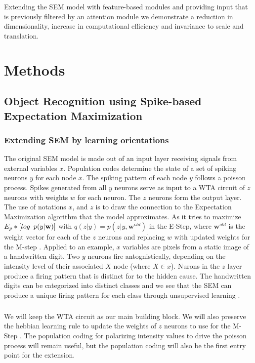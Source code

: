 \documentclass{report}
\begin{document}
Extending the SEM model with feature-based modules and providing input that is previously filtered by an attention module we demonstrate a reduction in dimensionality, increase in computational efficiency and invariance to scale and translation.

\chapter{Methods}
\section{Object Recognition using Spike-based Expectation Maximization}

\subsection{Extending SEM by learning orientations}

The original SEM model is made out of an input layer receiving signals from external variables $x$. Population codes determine the state of a set of spiking neurons $y$ for each node $x$. The spiking pattern of each node $y$ follows a poisson process. Spikes generated from all $y$ neurons serve as input to a WTA circuit of $z$ neurons with weights \textbf{$w$} for each neuron. The $z$ neurons form the output layer. The use of notations $x$, and $z$ is to draw the connection to the Expectation Maximization algorithm that the model approximates. As it tries to maximize $E_p*[log \hspace{5 pt} p(y|\textbf{w})]$ with $q(z|y)=p(z|y,\textbf{w}^{old})$ in the E-Step, where $\textbf{w}^{old}$ is the weight vector for each of the $z$ neurons and replacing \textbf{$w$} with updated weights for the M-step \cite{Nessler2010, Nessler2013, Habenschuss2013}.
Applied to an example, $x$ variables are pixels from a static image of a handwritten digit. Two $y$ neurons fire antognistically, depending on the intensity level of their associated $X$ node (where $X\in x$). Nurons in the $z$ layer produce a firing pattern that is distinct for to the hidden cause. The handwritten digits can be categorized into distinct classes and we see that the SEM can produce a unique firing pattern for each class through unsupervised learning \cite{Nessler2010}. 

\paragraph{}We will keep the WTA circuit as our main building block. We will also preserve the hebbian learning rule to update the weights of $z$ neurons to use for the M-Step \cite{Nessler2010}. The population coding for polarizing intensity values to drive the poisson process will remain useful, but the population coding will also be the first entry point for the extension.
\end{document}
